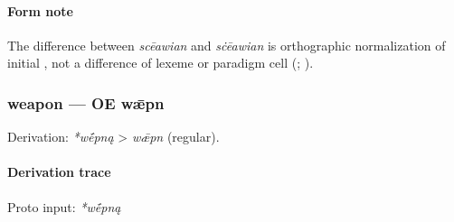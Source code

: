 \documentclass[
  british,
  a4paper,
]{article}
\begin{document}
\paragraph{Form note}\label{form-note-7}

The difference between \emph{scēawian} and \emph{sċēawian} is
orthographic normalization of initial \emph{}, not a difference of
lexeme or paradigm cell (;
).

\subsubsection{weapon --- OE wǣpn}\label{weapon-oe-wux1e3pn-2}

Derivation: \emph{*wḗpną} \textgreater{} \emph{wǣpn} (regular).

\paragraph{Derivation trace}\label{derivation-trace-35}

Proto input: \emph{*wḗpną}

\begingroup
\setlength{\fboxsep}{6pt}
\end{document}
